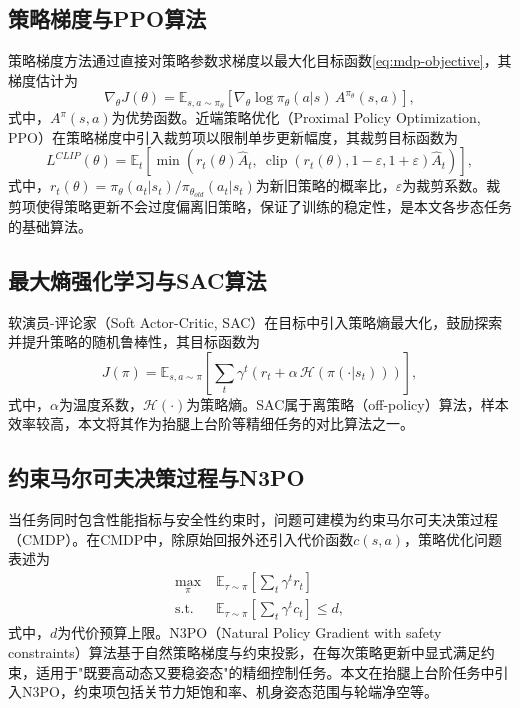 \subsection{策略梯度与PPO算法}

策略梯度方法通过直接对策略参数求梯度以最大化目标函数\eqref{eq:mdp-objective}，其梯度估计为
\begin{equation}
  \nabla_\theta J(\theta) = \mathbb{E}_{s,a\sim\pi_\theta}\left[\nabla_\theta \log\pi_\theta(a|s)\,A^{\pi_\theta}(s,a)\right],
  \label{eq:pg}
\end{equation}
式中，$A^{\pi}(s,a)$为优势函数。近端策略优化（Proximal Policy Optimization, PPO）\cite{ppo2017}在策略梯度中引入裁剪项以限制单步更新幅度，其裁剪目标函数为
\begin{equation}
  L^{CLIP}(\theta) = \mathbb{E}_t\left[\min\left(r_t(\theta)\hat{A}_t,\ \operatorname{clip}\left(r_t(\theta),1-\varepsilon,1+\varepsilon\right)\hat{A}_t\right)\right],
  \label{eq:ppo-clip}
\end{equation}
式中，$r_t(\theta) = \pi_\theta(a_t|s_t)/\pi_{\theta_{old}}(a_t|s_t)$为新旧策略的概率比，$\varepsilon$为裁剪系数。裁剪项使得策略更新不会过度偏离旧策略，保证了训练的稳定性，是本文各步态任务的基础算法。

\subsection{最大熵强化学习与SAC算法}

软演员-评论家（Soft Actor-Critic, SAC）\cite{sac2018}在目标中引入策略熵最大化，鼓励探索并提升策略的随机鲁棒性，其目标函数为
\begin{equation}
  J(\pi) = \mathbb{E}_{s,a\sim\pi}\left[\sum_{t}\gamma^t\left(r_t + \alpha\,\mathcal{H}\left(\pi(\cdot|s_t)\right)\right)\right],
  \label{eq:sac-objective}
\end{equation}
式中，$\alpha$为温度系数，$\mathcal{H}(\cdot)$为策略熵。SAC属于离策略（off-policy）算法，样本效率较高，本文将其作为抬腿上台阶等精细任务的对比算法之一。

\subsection{约束马尔可夫决策过程与N3PO}

当任务同时包含性能指标与安全性约束时，问题可建模为约束马尔可夫决策过程（CMDP）。在CMDP中，除原始回报外还引入代价函数$c(s,a)$，策略优化问题表述为
\begin{equation}
  \begin{aligned}
    \max_{\pi}\;&\mathbb{E}_{\tau\sim\pi}\left[\sum_{t}\gamma^t r_t\right]\\
    \text{s.t.}\;&\mathbb{E}_{\tau\sim\pi}\left[\sum_{t}\gamma^t c_t\right] \le d,
  \end{aligned}
  \label{eq:cmdp}
\end{equation}
式中，$d$为代价预算上限。N3PO（Natural Policy Gradient with safety constraints）算法基于自然策略梯度\cite{npg2001}与约束投影\cite{cpo2017}，在每次策略更新中显式满足约束，适用于"既要高动态又要稳姿态"的精细控制任务。本文在抬腿上台阶任务中引入N3PO，约束项包括关节力矩饱和率、机身姿态范围与轮端净空等。

